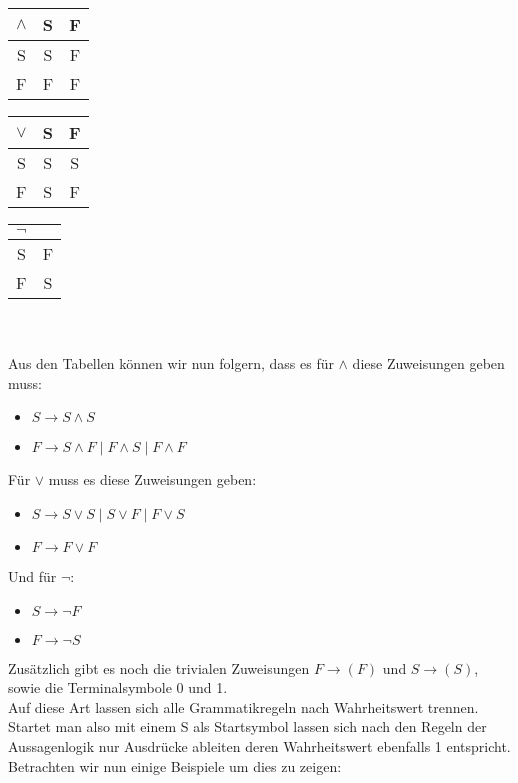 \documentclass[11pt]{article}
\begin{document}
\begin{tabular}[h]{c|cc}
$\wedge$ & S & F \\
\hline
S & S & F\\
F & F & F\\
\end{tabular}
\quad
\begin{tabular}[h]{c|cc}
$\vee$ & S & F \\
\hline
S & S & S\\
F & S & F\\
\end{tabular}
\quad
\begin{tabular}[h]{c|c}
$\neg$ \\
\hline
S & F\\
F & S\\
\end{tabular}
\\ \ \\Aus den Tabellen können wir nun folgern, dass es für $\wedge$ diese Zuweisungen geben muss:
\begin{itemize}
\item $S \rightarrow S \wedge S$
\item $F \rightarrow S \wedge F \mid F \wedge S \mid F \wedge F$  
\end{itemize}
Für $\vee$ muss es diese Zuweisungen geben:
\begin{itemize}
\item $S \rightarrow S \vee S \mid S \vee F \mid F \vee S$
\item $F \rightarrow F \vee F$
\end{itemize} 
Und für $\neg$:
\begin{itemize}
\item $S \rightarrow \neg F$
\item $F \rightarrow \neg S$
\end{itemize}
Zusätzlich gibt es noch die trivialen Zuweisungen $F\rightarrow (F)$ und $S\rightarrow (S)$, sowie die Terminalsymbole 0 und 1.
\\Auf diese Art lassen sich alle Grammatikregeln nach Wahrheitswert trennen. Startet man also mit einem S als Startsymbol lassen sich nach den Regeln der Aussagenlogik nur Ausdrücke ableiten deren Wahrheitswert ebenfalls 1 entspricht.
\\Betrachten wir nun einige Beispiele um dies zu zeigen:
\end{document}

